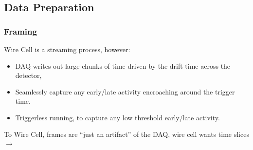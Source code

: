 \documentclass[xcolor=dvipsnames]{beamer}
\begin{document}
\subsection{Data Preparation}

\begin{frame}
  \frametitle{Framing}
  
  \vspace{-25mm}
  \begin{center}
  \end{center}

  \vspace{-10mm}

  \scriptsize
  Wire Cell is a streaming process, however:
  \begin{itemize}
  \item DAQ writes out large chunks of time driven by the drift time
    across the detector,
  \item Seamlessly capture any early/late activity
    encroaching around the trigger time.
  \item Triggerless running, to capture any low threshold early/late activity.
  \end{itemize}

  \vfill

  To Wire Cell, frames are ``just an artifact'' of the DAQ, wire cell wants time slices $\rightarrow$




\end{frame}
\end{document}
